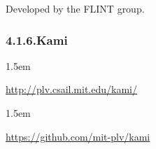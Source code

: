 \documentclass[12pt,twoside]{article}
\begin{document}
\noindent{}Developed by the FLINT group.%

\subsubsection{4.1.6.\hspace*{0.5em}Kami}%

\begin{mddefinitions}%


\begin{mdbmarginx}{}{}{}{1.5em}%
\begin{mddefdata}%
\href{http://plv.csail.mit.edu/kami/}{{\ttfamily http://\hspace{0pt}plv.\hspace{0pt}csail.\hspace{0pt}mit.\hspace{0pt}edu/\hspace{0pt}kami/\hspace{0pt}}}
\end{mddefdata}%
\end{mdbmarginx}%


\begin{mdbmarginx}{}{}{}{1.5em}%
\begin{mddefdata}%
\href{https://github.com/mit-plv/kami}{{\ttfamily https://\hspace{0pt}github.\hspace{0pt}com/\hspace{0pt}mit-\hspace{0pt}plv/\hspace{0pt}kami}}%
\end{mddefdata}%
\end{mdbmarginx}%
\end{mddefinitions}%
\end{document}
